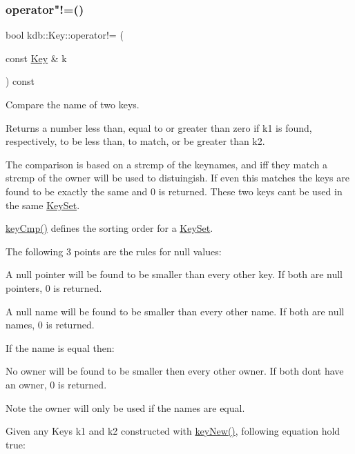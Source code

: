 \subsubsection{\texorpdfstring{operator"!=()}{operator!=()}}
{\footnotesize\ttfamily bool kdb\+::\+Key\+::operator!= (\begin{DoxyParamCaption}\item[{const \mbox{\hyperlink{classkdb_1_1Key}{Key}} \&}]{k }\end{DoxyParamCaption}) const\hspace{0.3cm}{\ttfamily [inline]}}



Compare the name of two keys. 

\begin{DoxyReturn}{Returns}
a number less than, equal to or greater than zero if k1 is found, respectively, to be less than, to match, or be greater than k2.
\end{DoxyReturn}
The comparison is based on a strcmp of the keynames, and iff they match a strcmp of the owner will be used to distuingish. If even this matches the keys are found to be exactly the same and 0 is returned. These two keys can\textquotesingle{}t be used in the same \mbox{\hyperlink{classkdb_1_1KeySet}{Key\+Set}}.

\mbox{\hyperlink{group__keytest_gaf6e66e12fe04d535a5d1c8218ced803e}{key\+Cmp()}} defines the sorting order for a \mbox{\hyperlink{classkdb_1_1KeySet}{Key\+Set}}.

The following 3 points are the rules for null values\+:


\begin{DoxyItemize}
\item A null pointer will be found to be smaller than every other key. If both are null pointers, 0 is returned.
\item A null name will be found to be smaller than every other name. If both are null names, 0 is returned.
\end{DoxyItemize}

If the name is equal then\+:


\begin{DoxyItemize}
\item No owner will be found to be smaller then every other owner. If both don\textquotesingle{}t have an owner, 0 is returned.
\end{DoxyItemize}

\begin{DoxyNote}{Note}
the owner will only be used if the names are equal.
\end{DoxyNote}
Given any Keys k1 and k2 constructed with \mbox{\hyperlink{group__key_gad23c65b44bf48d773759e1f9a4d43b89}{key\+New()}}, following equation hold true\+:


